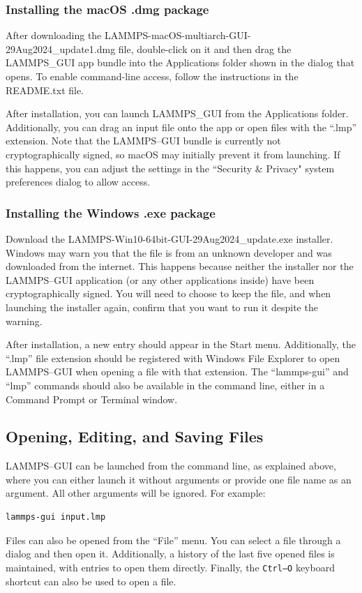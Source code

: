 \documentclass[9pt,tutorial]{livecoms}
\begin{document}
\begin{appendices}
\subsubsection{Installing the macOS .dmg package}

After downloading the LAMMPS-macOS-multiarch-GUI-29Aug2024\_update1.dmg file,
double-click on it and then drag the LAMMPS\_GUI app bundle
into the Applications folder shown in the dialog that opens.  To
enable command-line access, follow the instructions in the README.txt
file.

After installation, you can launch LAMMPS\_GUI from the Applications
folder. Additionally, you can drag an input file onto the app or open files with the
``.lmp'' extension.  Note that the LAMMPS--GUI bundle is currently not
cryptographically signed, so macOS may initially prevent it from launching.
If this happens, you can adjust the settings in the ``Security \& Privacy" system
preferences dialog to allow access.

\subsubsection{Installing the Windows .exe package}

Download the LAMMPS-Win10-64bit-GUI-29Aug2024\_update.exe installer.
Windows may warn you that the file is from an unknown developer
and was downloaded from the internet.  This happens because neither the
installer nor the LAMMPS--GUI application (or any other applications inside)
have been cryptographically signed.  You will need to choose to keep the file,
and when launching the installer again, confirm that you want to run it despite the warning.

After installation, a new entry should appear in the Start menu. Additionally,
the ``.lmp'' file extension should be registered with  Windows File
Explorer to open LAMMPS--GUI when opening a file with that
extension.  The ``lammps-gui'' and ``lmp'' commands should also be available
in the command line, either in a Command Prompt or Terminal window.

\subsection{Opening, Editing, and Saving Files}

LAMMPS--GUI can be launched from the command line, as explained above, where you
can either launch it without arguments or provide one file name as an argument.  All
other arguments will be ignored. For example:
\begin{lstlisting}
lammps-gui input.lmp
\end{lstlisting}
Files can also be opened from the ``File'' menu.  You can select a
file through a dialog and then open it.  Additionally, a history of
the last five opened files is maintained, with entries to open them directly.
Finally, the \texttt{Ctrl--O} keyboard shortcut can also be used to open a file.


\end{appendices}
\end{document}
